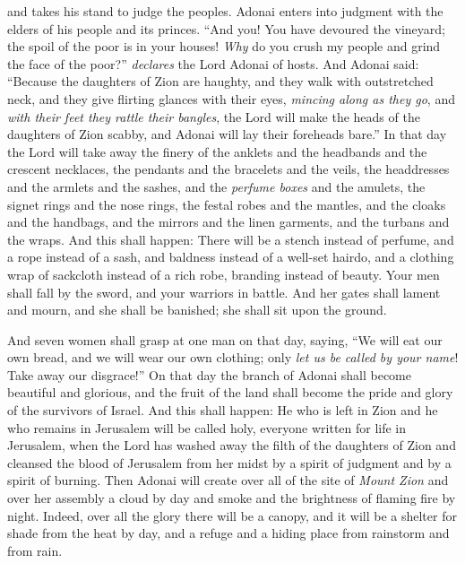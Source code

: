 \begin{biblechapter}
and takes his stand to judge the peoples.
\verse Adonai enters into judgment with the elders of his people and its princes. 
“And you! You have devoured the vineyard; 
the spoil of the poor is in your houses!
\verse \textit{Why} do you crush my people 
and grind the face of the poor?” \textit{declares} the Lord Adonai of hosts.
 And Adonai said: “Because the daughters of Zion are haughty, 
and they walk with outstretched neck, 
and they give flirting glances with their eyes, 
\textit{mincing along as they go}, 
and \textit{with their feet they rattle their bangles},
\verse the Lord will make the heads of the daughters of Zion scabby, 
and Adonai will lay their foreheads bare.”
\verse In that day the Lord will take away the finery of the anklets 
and the headbands and the crescent necklaces,
\verse the pendants and the bracelets and the veils,
\verse the headdresses and the armlets and the sashes, 
and the \textit{perfume boxes} and the amulets,
\verse the signet rings and the nose rings,
\verse the festal robes and the mantles, 
and the cloaks and the handbags,
\verse and the mirrors and the linen garments, 
and the turbans and the wraps.
\verse And this shall happen: There will be 
a stench instead of perfume, 
and a rope instead of a sash, 
and baldness instead of a well-set hairdo, 
and a clothing wrap of sackcloth instead of a rich robe, 
branding instead of beauty.
\verse Your men shall fall by the sword, 
and your warriors in battle.
\verse And her gates shall lament and mourn, 
and she shall be banished; 
she shall sit upon the ground.
\end{biblechapter}

\begin{biblechapter} %
\verse And seven women shall grasp at one man on that day, saying, 
“We will eat our own bread, 
and we will wear our own clothing; 
only \textit{let us be called by your name}! 
Take away our disgrace!”
 On that day the branch of Adonai shall become beautiful and glorious, 
and the fruit of the land shall become the pride and glory of the survivors of Israel.
\verse And this shall happen: He who is left in Zion 
and he who remains in Jerusalem will be called holy, 
everyone written for life in Jerusalem,
\verse when the Lord has washed away the filth of the daughters of Zion 
and cleansed the blood of Jerusalem from her midst 
by a spirit of judgment 
and by a spirit of burning.
\verse Then Adonai will create over all of the site of \textit{Mount Zion} 
and over her assembly a cloud by day 
and smoke and the brightness of flaming fire by night. 
Indeed, over all the glory there will be a canopy,
\verse and it will be a shelter for shade from the heat by day, 
and a refuge and a hiding place from rainstorm and from rain.
\end{biblechapter}

